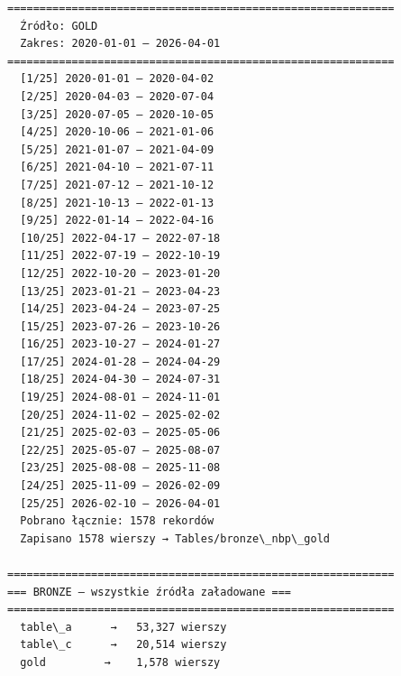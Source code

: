 \documentclass[11pt]{article}
\begin{document}
\begin{Verbatim}[commandchars=\\\{\}]
============================================================
  Źródło: GOLD
  Zakres: 2020-01-01 — 2026-04-01
============================================================
  [1/25] 2020-01-01 — 2020-04-02
  [2/25] 2020-04-03 — 2020-07-04
  [3/25] 2020-07-05 — 2020-10-05
  [4/25] 2020-10-06 — 2021-01-06
  [5/25] 2021-01-07 — 2021-04-09
  [6/25] 2021-04-10 — 2021-07-11
  [7/25] 2021-07-12 — 2021-10-12
  [8/25] 2021-10-13 — 2022-01-13
  [9/25] 2022-01-14 — 2022-04-16
  [10/25] 2022-04-17 — 2022-07-18
  [11/25] 2022-07-19 — 2022-10-19
  [12/25] 2022-10-20 — 2023-01-20
  [13/25] 2023-01-21 — 2023-04-23
  [14/25] 2023-04-24 — 2023-07-25
  [15/25] 2023-07-26 — 2023-10-26
  [16/25] 2023-10-27 — 2024-01-27
  [17/25] 2024-01-28 — 2024-04-29
  [18/25] 2024-04-30 — 2024-07-31
  [19/25] 2024-08-01 — 2024-11-01
  [20/25] 2024-11-02 — 2025-02-02
  [21/25] 2025-02-03 — 2025-05-06
  [22/25] 2025-05-07 — 2025-08-07
  [23/25] 2025-08-08 — 2025-11-08
  [24/25] 2025-11-09 — 2026-02-09
  [25/25] 2026-02-10 — 2026-04-01
  Pobrano łącznie: 1578 rekordów
  Zapisano 1578 wierszy → Tables/bronze\_nbp\_gold

============================================================
=== BRONZE — wszystkie źródła załadowane ===
============================================================
  table\_a      →   53,327 wierszy
  table\_c      →   20,514 wierszy
  gold         →    1,578 wierszy
    \end{Verbatim}


    
    
    
\end{document}
